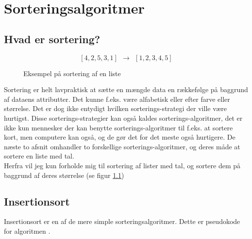 \chapter{Sorteringsalgoritmer}
\label{ch:Sorteringsalgoritmer}

\section{Hvad er sortering?}
\label{sec:Hvad er sortering?}

\begin{figure}
	\begin{center}
		$$[4,2,5,3,1] \:\:\longrightarrow\:\: [1,2,3,4,5]$$
	\end{center}
	\caption{Eksempel på sortering af en liste}
	\label{fig:Eksempel på sortering af en liste}
\end{figure}


Sortering er helt lavpraktisk at sætte en mængde data en rækkefølge på baggrund af dataens attributter. Det kunne f.eks. være alfabetisk eller efter farve eller størrelse. Det er dog ikke entydigt hvilken sorterings-strategi der ville være hurtigst. Disse sorterings-strategier kan også kaldes sorterings-algoritmer, det er ikke kun mennesker der kan benytte sorterings-algoritmer til f.eks. at sortere kort, men computere kan også, og de gør det for det meste også hurtigere. De næste to afsnit omhandler to forskellige sorterings-algoritmer, og deres måde at sortere en liste med tal.\\


Herfra vil jeg kun forholde mig til sortering af lister med tal, og sortere dem på baggrund af deres størrelse (se figur \ref{fig:Eksempel på sortering af en liste})


\section{Insertionsort}
\label{sec:Insertionsort}

Insertionsort er en af de mere simple sorteringsalgoritmer. Dette er pseudokode for algoritmen \cite[s. 104]{aogd}.

